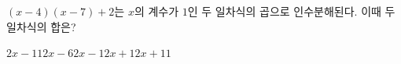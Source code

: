 $(x-4)(x-7)+2$는 $x$의 계수가 $1$인 두 일차식의 곱으로 인수분해된다. 이때 두 일차식의 합은?
\begin{choices32}{$2x-11$}{$2x-6$}{$2x-1$}{$2x+1$}{$2x+11$}\end{choices32}
